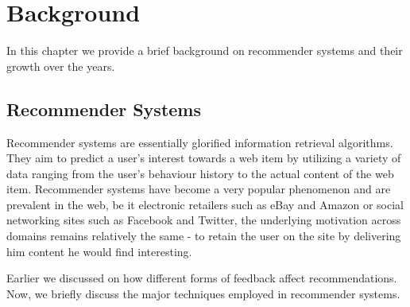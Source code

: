 \chapter{Background}
In this chapter we provide a brief background on recommender systems and their growth over the years.


\section{Recommender Systems}
Recommender systems are essentially glorified information retrieval algorithms. They aim to predict a user's interest towards a web item by utilizing a variety of data ranging from the user's behaviour history to the actual content of the web item. Recommender systems have become a very popular phenomenon and are prevalent in the web, be it electronic retailers such as eBay and Amazon or social networking sites such as Facebook and Twitter, the underlying motivation across domains remains relatively the same - to retain the user on the site by delivering him content he would find interesting.

Earlier we discussed on how different forms of feedback affect recommendations. Now, we briefly discuss the major techniques employed in recommender systems.

